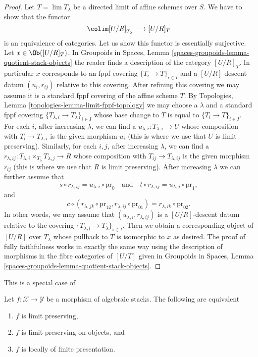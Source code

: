 \begin{proof}
\medskip\noindent
Let $T = \lim T_\lambda$ be a directed limit of affine schemes over $S$.
We have to show that the functor
$$
\colim [U/R]_{T_\lambda} \longrightarrow [U/R]_T
$$
is an equivalence of categories. Let us show this functor is
essentially surjective. Let $x \in \Ob([U/R]_T)$. In
Groupoids in Spaces, Lemma \ref{spaces-groupoids-lemma-quotient-stack-objects}
the reader finds a description of the category $[U/R]_T$.
In particular $x$ corresponds to an fppf covering
$\{T_i \to T\}_{i \in I}$ and a $[U/R]$-descent datum
$(u_i, r_{ij})$ relative to this covering.
After refining this covering we may assume it is a standard
fppf covering of the affine scheme $T$.
By Topologies, Lemma
\ref{topologies-lemma-limit-fppf-topology}
we may choose a $\lambda$ and a standard fppf covering
$\{T_{\lambda, i} \to T_\lambda\}_{i \in I}$ whose base change to $T$
is equal to $\{T_i \to T\}_{i \in I}$.
For each $i$, after increasing $\lambda$, we can find
a $u_{\lambda, i} : T_{\lambda, i} \to U$ whose composition
with $T_i \to T_{\lambda, i}$ is the given morphism $u_i$
(this is where we use that $U$ is limit preserving).
Similarly, for each $i, j$, after increasing $\lambda$, we can find
a $r_{\lambda, ij} : T_{\lambda, i} \times_{T_\lambda} T_{\lambda, j} \to R$
whose composition with $T_{ij} \to T_{\lambda, ij}$ is the given morphism
$r_{ij}$ (this is where we use that $R$ is limit preserving).
After increasing $\lambda$ we can further assume that
$$
s \circ r_{\lambda, ij} = u_{\lambda, i} \circ \text{pr}_0
\quad\text{and}\quad
t \circ r_{\lambda, ij} = u_{\lambda, j} \circ \text{pr}_1,
$$
and
$$
c \circ (r_{\lambda, jk} \circ \text{pr}_{12}, r_{\lambda, ij}
\circ \text{pr}_{01}) = r_{\lambda, ik} \circ \text{pr}_{02}.
$$
In other words, we may assume that $(u_{\lambda, i}, r_{\lambda, ij})$
is a $[U/R]$-descent datum relative to the covering
$\{T_{\lambda, i} \to T_\lambda\}_{i \in I}$.
Then we obtain a corresponding object of $[U/R]$ over $T_\lambda$
whose pullback to $T$ is isomorphic to $x$ as desired.
The proof of fully faithfulness works in exactly the same
way using the description of morphisms
in the fibre categories of $[U/T]$ given in
Groupoids in Spaces, Lemma \ref{spaces-groupoids-lemma-quotient-stack-objects}.
\end{proof}

\begin{proposition}
\label{proposition-characterize-locally-finite-presentation}
\begin{reference}
This is a special case of \cite[Lemma 2.3.15]{Emerton-Gee}
\end{reference}
Let $f : \mathcal{X} \to \mathcal{Y}$ be a morphism of algebraic stacks.
The following are equivalent
\begin{enumerate}
\item $f$ is limit preserving,
\item $f$ is limit preserving on objects, and
\item $f$ is locally of finite presentation.
\end{enumerate}
\end{proposition}

